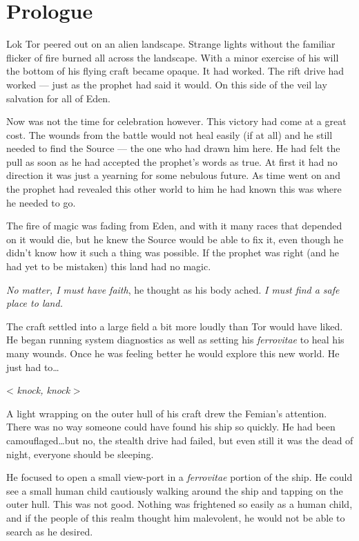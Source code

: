 
\chapter*{Prologue}
Lok Tor peered out on an alien landscape. Strange lights without the familiar
flicker of fire burned all across the landscape. With a minor exercise of his
will the bottom of his flying craft became opaque. It had worked. The rift
drive had worked --- just as the prophet had said it would. On this side of the
veil lay salvation for all of Eden.

Now was not the time for celebration however. This victory had come at a great
cost. The wounds from the battle would not heal easily (if at all) and he still
needed to find the Source --- the one who had drawn him here. He had felt the
pull as soon as he had accepted the prophet's words as true. At first it had no
direction it was just a yearning for some nebulous future. As time went on and
the prophet had revealed this other world to him he had known this was where he
needed to go.

The fire of magic was fading from Eden, and with it many races that depended on
it would die, but he knew the Source would be able to fix it, even though he
didn't know how it such a thing was possible. If the prophet was right (and he
had yet to be mistaken) this land had no magic.

\textit{No matter, I must have faith}, he thought as his body ached. \textit{I
must find a safe place to land.}

The craft settled into a large field a bit more loudly than Tor would have
liked. He began running system diagnostics as well as setting his
\textit{ferrovitae} to heal his many wounds. Once he was feeling better he
would explore this new world. He just had to\ldots

< \textit{knock, knock} >

A light wrapping on the outer hull of his craft drew the Femian's attention.
There was no way someone could have found his ship so quickly. He had been
camouflaged\ldots but no, the stealth drive had failed, but even still it was
the dead of night, everyone should be sleeping.

He focused to open a small view-port in a \textit{ferrovitae} portion of the
ship. He could see a small human child cautiously walking around the ship and
tapping on the outer hull. This was not good. Nothing was frightened so easily
as a human child, and if the people of this realm thought him malevolent, he
would not be able to search as he desired.


